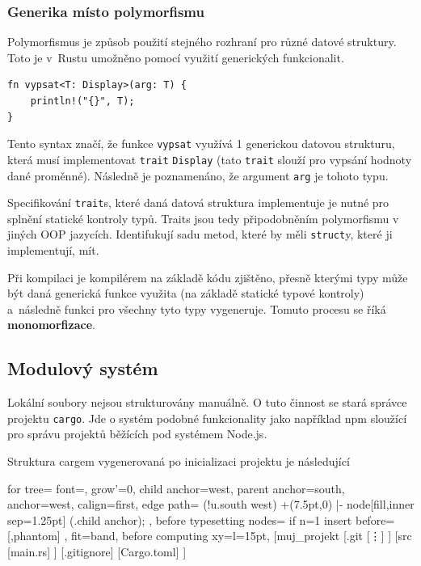 \documentclass[a4paper, 12pt, twoside]{article} %
\begin{document}
		\subsubsection{Generika místo polymorfismu}
			Polymorfismus je způsob použití stejného rozhraní pro různé datové struktury. Toto je v~Rustu umožněno pomocí využití generických funkcionalit.
			\begin{verbatim}
fn vypsat<T: Display>(arg: T) {
	println!("{}", T);
}
			\end{verbatim}
			
			Tento syntax značí, že funkce \texttt{vypsat} využívá 1 generickou datovou strukturu, která musí implementovat \texttt{trait} \texttt{Display} (tato \texttt{trait} slouží pro vypsání hodnoty dané proměnné). Následně je poznamenáno, že argument \texttt{arg} je tohoto typu.
			
			Specifikování \texttt{trait}s, které daná datová struktura implementuje je nutné pro splnění statické kontroly typů. Traits jsou tedy připodobněním polymorfismu v~ jiných OOP jazycích. Identifukují sadu metod, které by měli \texttt{struct}y, které ji implementují, mít.
			
			Při kompilaci je kompilérem na základě kódu zjištěno, přesně kterými typy může být daná generická funkce využita (na základě statické typové kontroly) a~následně funkci pro všechny tyto typy vygeneruje. Tomuto procesu se říká \textbf{monomorfizace}.

	\subsection{Modulový systém}
		Lokální soubory nejsou strukturovány manuálně. O tuto činnost se stará správce projektu \texttt{cargo}. Jde o systém podobné funkcionality jako například npm sloužící pro správu projektů běžících pod systémem Node.js.
		
		Struktura cargem vygenerovaná po inicializaci projektu je následující
		\begin{center}
			\begin{forest}
				for tree={
				font=\ttfamily,
				grow'=0,
				child anchor=west,
				parent anchor=south,
				anchor=west,
				calign=first,
				edge path={
					\noexpand{}
					(!u.south west) +(7.5pt,0) |- node[fill,inner sep=1.25pt] {} (.child anchor);
				},
				before typesetting nodes={
					if n=1
					{insert before={[,phantom]}}
					{}
				},
				fit=band,
				before computing xy={l=15pt},
				}
			[muj\_projekt
				[.git
					[\vdots]
				]
				[src
					[main.rs]
				]
				[.gitignore]
				[Cargo.toml]
			]
			\end{forest}
		\end{center}
		
\end{document}
